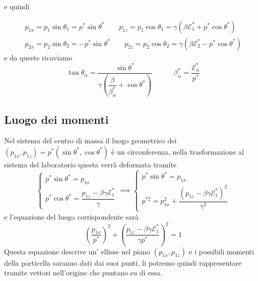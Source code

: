 \documentclass[12pt,a4paper,titlepage, twoside, openright]{book}
\numberwithin{equation}{chapter}
\begin{document}
e quindi 

\begin{gather*}
p_{1x}=p_1\sin{\theta_1}=p^*\sin{\theta^*} \qquad
p_{1z}=p_1\cos{\theta_1}=\gamma(\beta\mathcal{E}_1^*+p^*\cos{\theta^*}) \\
p_{2x}=p_2\sin{\theta_2}=-p^*\sin{\theta^*} \qquad
p_{2z}=p_2\cos{\theta_2}=\gamma(\beta\mathcal{E}_2^*-p^*\cos{\theta^*})
\end{gather*}
e da queste ricaviamo
\begin{equation}
\tan{\theta_\alpha}=\dfrac{\sin{\theta^*}}{\gamma\left( \dfrac{\beta}{\beta_\alpha^*} + \cos{\theta^*} \right)} \qquad\quad \beta_\alpha^*=\dfrac{\mathcal{E}_\alpha^*}{p^*}
\end{equation}

\subsection{Luogo dei momenti}

Nel sistema del centro di massa il luogo geometrico dei $(p_{1x},p_{1z})=p^*(\sin{\theta^*},\cos{\theta^*})$ è un circonferenza, nella trasformazione al sistema del laboratorio questa verrà deformata tramite
\[
\begin{cases}
p^*\sin{\theta^*}=p_{1x} \\
p^*\cos{\theta^*}=\dfrac{p_{1z}-\beta\gamma\mathcal{E}_1^*}{\gamma}
\end{cases}
\implies
\begin{cases}
p^*\sin{\theta^*}=p_{1x}\\
p^{*2}=p_{1x}^2+\dfrac{\left(p_{1z} -\beta\gamma\mathcal{E}_1^*\right)^2}{\gamma^2}
\end{cases}
\]
e l'equazione del luogo corrispondente sarà
\begin{equation}
\left( \dfrac{p_{1x}}{p^*} \right)^2 + \left( \dfrac{p_{1z}-\beta\gamma\mathcal{E}_1^*}{\gamma p^*} \right)^2 =1
\end{equation}
Questa equazione descrive un' ellisse nel piano $(p_{1x},p_{1z})$ e i possibili momenti della particella saranno dati dai suoi punti, li potremo quindi rappresentare tramite vettori nell'origine che puntano su di essa.
\end{document}
